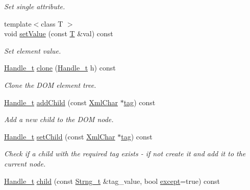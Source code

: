 \begin{DoxyCompactItemize}
\begin{DoxyCompactList}\small\item\em Set single attribute. \end{DoxyCompactList}\item 
{\footnotesize template$<$class T $>$ }\\void \hyperlink{class_d_d4hep_1_1_x_m_l_1_1_element_a86df8ae52c2b8c1dc75c292a04da7882}{set\+Value} (const \hyperlink{class_t}{T} \&val) const
\begin{DoxyCompactList}\small\item\em Set element value. \end{DoxyCompactList}\item 
\hyperlink{class_d_d4hep_1_1_x_m_l_1_1_handle__t}{Handle\+\_\+t} \hyperlink{class_d_d4hep_1_1_x_m_l_1_1_element_a2bc885da092d05f5086c2538b87ccede}{clone} (\hyperlink{class_d_d4hep_1_1_x_m_l_1_1_handle__t}{Handle\+\_\+t} h) const
\begin{DoxyCompactList}\small\item\em Clone the D\+OM element tree. \end{DoxyCompactList}\item 
\hyperlink{class_d_d4hep_1_1_x_m_l_1_1_handle__t}{Handle\+\_\+t} \hyperlink{class_d_d4hep_1_1_x_m_l_1_1_element_ab2db1252475a942e0e255660c2377f0e}{add\+Child} (const \hyperlink{namespace_d_d4hep_1_1_x_m_l_a09e5d9cc86ed782f6826dfe0778c1815}{Xml\+Char} $\ast$\hyperlink{class_d_d4hep_1_1_x_m_l_1_1_element_ade0bb178aee242e967d48be672c66b1d}{tag}) const
\begin{DoxyCompactList}\small\item\em Add a new child to the D\+OM node. \end{DoxyCompactList}\item 
\hyperlink{class_d_d4hep_1_1_x_m_l_1_1_handle__t}{Handle\+\_\+t} \hyperlink{class_d_d4hep_1_1_x_m_l_1_1_element_acb67377082cda6f8405fc161d6f016d0}{set\+Child} (const \hyperlink{namespace_d_d4hep_1_1_x_m_l_a09e5d9cc86ed782f6826dfe0778c1815}{Xml\+Char} $\ast$\hyperlink{class_d_d4hep_1_1_x_m_l_1_1_element_ade0bb178aee242e967d48be672c66b1d}{tag}) const
\begin{DoxyCompactList}\small\item\em Check if a child with the required tag exists -\/ if not create it and add it to the current node. \end{DoxyCompactList}\item 
\hyperlink{class_d_d4hep_1_1_x_m_l_1_1_handle__t}{Handle\+\_\+t} \hyperlink{class_d_d4hep_1_1_x_m_l_1_1_element_ac41048246c8a1138d5d81ca0b51b6ae7}{child} (const \hyperlink{class_d_d4hep_1_1_x_m_l_1_1_strng__t}{Strng\+\_\+t} \&tag\+\_\+value, bool \hyperlink{namespace_d_d4hep_af8602b0b80e0c252cf28e5fbbc81abcc}{except}=true) const

\end{DoxyCompactItemize}
